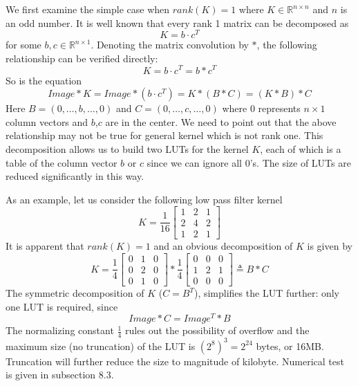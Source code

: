 \documentclass[12pt]{amsart}
\theoremstyle{definition}
\theoremstyle{remark}
\numberwithin{thm}{section}
\begin{document}
We first examine the simple case when $rank(K)=1$ where $K\in \mathbb{R}^{n\times n}$ and $n$ is an odd number. It is well known that every rank 1 matrix can be decomposed as
\[K=b\cdot c^T\]
for some $b,c\in \mathbb{R}^{n\times 1}$. Denoting the matrix convolution by $*$, the following relationship can be verified directly: 
\[K=b\cdot c^T=b*c^T\]
So is the equation
\begin{equation}\label{decomposition}
Image*K=Image*(b\cdot c^T)=K*(B*C)=(K*B)*C
\end{equation}
Here $B=(0,\dots,b,\dots,0)$ and $C=(0,\dots,c,\dots,0)$ where $0$ represents $n\times 1$ column vectors and $b$,$c$ are in the center. We need to point out that the above relationship may not be true for general kernel which is not rank one. This decomposition allows us to build two LUTs for the kernel $K$, each of which is a table of the column vector $b$ or $c$ since we can ignore all $0$'s. The size of LUTs are reduced significantly in this way.

As an example, let us consider the following low pass filter kernel
$$
K=\frac{1}{16}
\begin{bmatrix}
1 & 2 & 1\\
2 & 4 & 2\\
1 & 2 & 1
\end{bmatrix}
$$
It is apparent that $rank(K)=1$ and an obvious decomposition of $K$ is given by 
$$
K=\frac{1}{4}
\begin{bmatrix}
0 & 1 & 0\\
0 & 2 & 0\\
0 & 1 & 0
\end{bmatrix}*\frac{1}{4}
\begin{bmatrix}
0 & 0 & 0\\
1 & 2 & 1\\
0 & 0 & 0
\end{bmatrix}\triangleq B*C
$$
The symmetric decomposition of $K$ ($C=B^T$), simplifies the LUT further: only one LUT is required, since
\[Image*C=Image^T*B\]
The normalizing constant $\frac{1}{4}$ rules out the possibility of overflow and the maximum size (no truncation) of the LUT is $(2^8)^3=2^{24}$ bytes, or 16MB. Truncation will further reduce the size to magnitude of kilobyte. Numerical test is given in subsection 8.3. 
\end{document}
